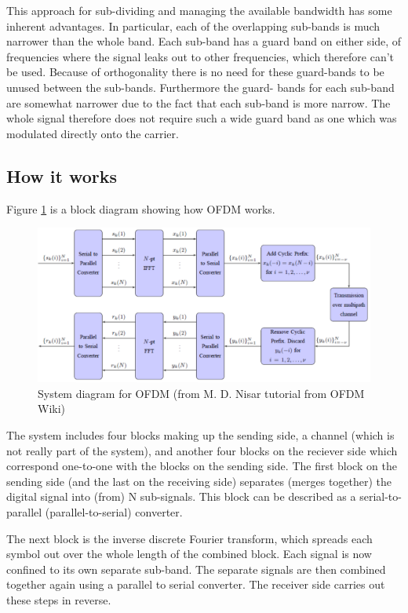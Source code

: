 This approach for sub-dividing and managing the available bandwidth has some inherent
advantages. In particular, each of the overlapping sub-bands is much narrower than the whole
band. Each sub-band has a guard band on either side, of frequencies where the signal leaks
out to other frequencies, which therefore can’t be used. Because of orthogonality there is
no need for these guard-bands to be unused between the sub-bands. Furthermore the guard-
bands for each sub-band are somewhat narrower due to the fact that each sub-band is more
narrow. The whole signal therefore does not require such a wide guard band as one which
was modulated directly onto the carrier.

\subsection{How it works}

Figure \ref{ofdmfig} is a block diagram showing how OFDM works.
\begin{figure}
\begin{center}
\includegraphics[width=15 cm]{ofdmfig.png}
\caption{System diagram for OFDM (from M. D. Nisar tutorial from OFDM Wiki)}\label{ofdmfig}
\end{center}
\end{figure}

The system includes four blocks making up the sending side, a channel (which is not really
part of the system), and another four blocks on the reciever side which correspond one-to-one
with the blocks on the sending side. The first block on the sending side (and the last on the
receiving side) separates (merges together) the digital signal into (from) N sub-signals. This
block can be described as a serial-to-parallel (parallel-to-serial) converter.

The next block is the inverse discrete Fourier transform, which spreads each symbol out over
the whole length of the combined block. Each signal is now confined to its own separate
sub-band. The separate signals are then combined together again using a parallel to serial
converter. The receiver side carries out these steps in reverse.

